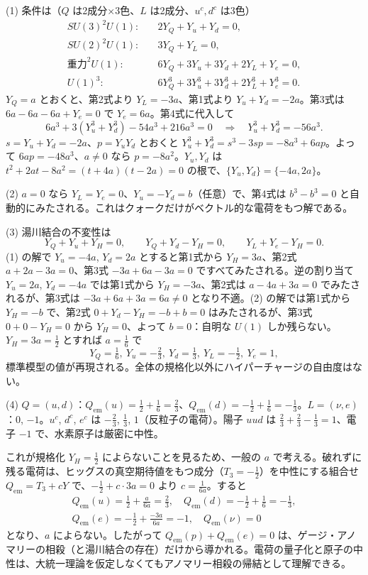 \begin{solution}
(1) 条件は（$Q$ は2成分×3色、$L$ は2成分、$u^c,d^c$ は3色）
\begin{align*}
SU(3)^2U(1):&\quad 2Y_Q+Y_u+Y_d=0,\\
SU(2)^2U(1):&\quad 3Y_Q+Y_L=0,\\
\text{重力}^2U(1):&\quad 6Y_Q+3Y_u+3Y_d+2Y_L+Y_e=0,\\
U(1)^3:&\quad 6Y_Q^3+3Y_u^3+3Y_d^3+2Y_L^3+Y_e^3=0 .
\end{align*}
$Y_Q=a$ とおくと、第2式より $Y_L=-3a$、第1式より $Y_u+Y_d=-2a$。第3式は $6a-6a-6a+Y_e=0$ で $Y_e=6a$。第4式に代入して
\[
6a^3+3(Y_u^3+Y_d^3)-54a^3+216a^3=0\quad\Longrightarrow\quad Y_u^3+Y_d^3=-56a^3 .
\]
$s=Y_u+Y_d=-2a$、$p=Y_uY_d$ とおくと $Y_u^3+Y_d^3=s^3-3sp=-8a^3+6ap$。よって $6ap=-48a^3$、$a\ne0$ なら $p=-8a^2$。$Y_u,Y_d$ は $t^2+2at-8a^2=(t+4a)(t-2a)=0$ の根で、$\{Y_u,Y_d\}=\{-4a,2a\}$。

(2) $a=0$ なら $Y_L=Y_e=0$、$Y_u=-Y_d=b$（任意）で、第4式は $b^3-b^3=0$ と自動的にみたされる。これはクォークだけがベクトル的な電荷をもつ解である。

(3) 湯川結合の不変性は
\[
Y_Q+Y_u+Y_H=0,\qquad Y_Q+Y_d-Y_H=0,\qquad Y_L+Y_e-Y_H=0 .
\]
(1) の解で $Y_u=-4a$, $Y_d=2a$ とすると第1式から $Y_H=3a$、第2式 $a+2a-3a=0$、第3式 $-3a+6a-3a=0$ ですべてみたされる。逆の割り当て $Y_u=2a$, $Y_d=-4a$ では第1式から $Y_H=-3a$、第2式は $a-4a+3a=0$ でみたされるが、第3式は $-3a+6a+3a=6a\ne0$ となり不適。(2) の解では第1式から $Y_H=-b$ で、第2式 $0+Y_d-Y_H=-b+b=0$ はみたされるが、第3式 $0+0-Y_H=0$ から $Y_H=0$、よって $b=0$：自明な $U(1)$ しか残らない。$Y_H=3a=\frac12$ とすれば $a=\frac16$ で
\[
Y_Q=\tfrac16,\ Y_u=-\tfrac23,\ Y_d=\tfrac13,\ Y_L=-\tfrac12,\ Y_e=1,
\]
標準模型の値が再現される。全体の規格化以外にハイパーチャージの自由度はない。

(4) $Q=(u,d)$：$Q_{\mathrm{em}}(u)=\frac12+\frac16=\frac23$、$Q_{\mathrm{em}}(d)=-\frac12+\frac16=-\frac13$。$L=(\nu,e)$：$0$, $-1$。$u^c$, $d^c$, $e^c$ は $-\frac23$, $\frac13$, $1$（反粒子の電荷）。陽子 $uud$ は $\frac23+\frac23-\frac13=1$、電子 $-1$ で、水素原子は厳密に中性。

これが規格化 $Y_H=\frac12$ によらないことを見るため、一般の $a$ で考える。破れずに残る電荷は、ヒッグスの真空期待値をもつ成分（$T_3=-\frac12$）を中性にする組合せ $Q_{\mathrm{em}}=T_3+cY$ で、$-\frac12+c\cdot3a=0$ より $c=\frac{1}{6a}$。すると
\begin{gather*}
Q_{\mathrm{em}}(u)=\tfrac12+\tfrac{a}{6a}=\tfrac23,\quad Q_{\mathrm{em}}(d)=-\tfrac12+\tfrac16=-\tfrac13,\\
Q_{\mathrm{em}}(e)=-\tfrac12+\tfrac{-3a}{6a}=-1,\quad Q_{\mathrm{em}}(\nu)=0
\end{gather*}
となり、$a$ によらない。したがって $Q_{\mathrm{em}}(p)+Q_{\mathrm{em}}(e)=0$ は、ゲージ・アノマリーの相殺（と湯川結合の存在）だけから導かれる。電荷の量子化と原子の中性は、大統一理論を仮定しなくてもアノマリー相殺の帰結として理解できる。
\end{solution}


